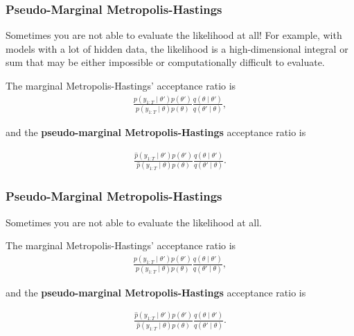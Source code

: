\documentclass{beamer}
\begin{document}
\begin{frame}[fragile]
\frametitle{Pseudo-Marginal Metropolis-Hastings}

Sometimes you are not able to evaluate the likelihood at all! For example, with models with a lot of hidden data, the likelihood is a high-dimensional integral or sum that may be either impossible or computationally difficult to evaluate.
\newline
\pause

The marginal Metropolis-Hastings' acceptance ratio is
\begin{align*}
\frac{  p(y_{1:T} \mid \theta') p(\theta')}{  p(y_{1:T} \mid \theta) p(\theta) }
\frac{ q(\theta \mid \theta') }{  q(\theta' \mid \theta) },
\end{align*}

and the {\bf pseudo-marginal Metropolis-Hastings} acceptance ratio is 

\begin{align*}
\frac{ \hat{p}(y_{1:T} \mid \theta') p(\theta') }{  \hat{p}(y_{1:T} \mid \theta) p(\theta) }
\frac{ q(\theta \mid \theta') }{  q(\theta' \mid \theta) }.
\end{align*}

\end{frame}

\begin{frame}[fragile]
\frametitle{Pseudo-Marginal Metropolis-Hastings}

Sometimes you are not able to evaluate the likelihood at all.
\newline

The marginal Metropolis-Hastings' acceptance ratio is
\begin{align*}
\frac{  p(y_{1:T} \mid \theta') p(\theta')}{  p(y_{1:T} \mid \theta) p(\theta) }
\frac{ q(\theta \mid \theta') }{  q(\theta' \mid \theta) },
\end{align*}

and the {\bf pseudo-marginal Metropolis-Hastings} acceptance ratio is 

\begin{align*}
\frac{ \hat{p}(y_{1:T} \mid \theta') p(\theta') }{  \hat{p}(y_{1:T} \mid \theta) p(\theta) }
\frac{ q(\theta \mid \theta') }{  q(\theta' \mid \theta) }.
\end{align*}

\end{frame}
\end{document}
